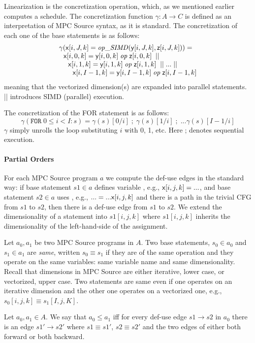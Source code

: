 Linearization is the concretization operation, which, as we mentioned earlier computes a schedule.
The concretization function $\gamma: A \rightarrow C$ is defined as an interpretation of
MPC Source syntax, as it is standard. The concretization of each one
of the base statements is as follows:
\[\begin{array}{l}
\gamma({\sf {x}}[i,J,k] = \mathit{op\_SIMD}({\sf y}[i,J,k], {\sf z}[i,J,k])) = \\
~~{\sf {x}}[i,0,k] = {\sf y}[i,0,k] \; \mathit{op} \; {\sf z}[i,0,k] \;\; || \\
~~~~{\sf {x}}[i,1,k] = {\sf y}[i,1,k] \; \mathit{op} \; {\sf z}[i,1,k] \;\; || \; ...\; || \\
~~~~~~{\sf {x}}[i,I-1,k] = {\sf y}[i,I-1,k] \; \mathit{op} \; {\sf z}[i,I-1,k]
\end{array}\]
meaning that the vectorized dimension(s) are expanded into parallel statements. || introduces SIMD (parallel) execution.

The concretization of the FOR statement is as follows:
\[ \gamma(\texttt{FOR} \; 0 \le i < I: s) = \gamma(s)[0/i] \; ; \; \gamma(s)[1/i] \; ; \; ... \gamma(s)[I-1/i] \]
$\gamma$ simply unrolls the loop substituting $i$ with 0, 1, etc. Here ; denotes sequential execution.

\paragraph{Partial Orders}

For each MPC Source program $a$ we compute the def-use edges in the standard way: if base statement $s1 \in a$ defines variable \x, e.g., ${\sf {x}}[i,j,k] = ...$,
and base statement $s2 \in a$ uses \x, e.g., $... = ... {\sf {x}}[i,j,k]$ and there is a path in the trivial CFG from $s1$ to $s2$, then there is a def-use edge from
 $s1$ to $s2$. We extend the dimensionality of a statement into $s1[i,j,k]$ where $s1[i,j,k]$ inherits the dimensionality of the left-hand-side of the assignment.

 Let $a_0, a_1$ be two MPC Source programs in $A$.
 Two base statements, $s_0 \in a_0$ and $s_1 \in a_1$ are \emph{same}, written $s_0 \equiv s_1$ if they are of the same operation and they operate on
 the same variables: same variable name and same dimensionality. Recall that dimensions in MPC Source are either iterative, lower case, or vectorized, upper case.
 Two statements are same even if one operates on an iterative dimension and the other one operates on a vectorized one, e.g., $s_0[i,j,k] \equiv s_1[I,j,K]$.

 \begin{definition} Let $a_0, a_1 \in A$. We say that $a_0 \le a_1$ iff for every def-use edge $s1 \rightarrow s2$ in $a_0$ there is an edge
 $s1' \rightarrow s2'$ where $s1 \equiv s1'$, $s2 \equiv s2'$ and the two edges of either both forward or both backward.
 \end{definition}

